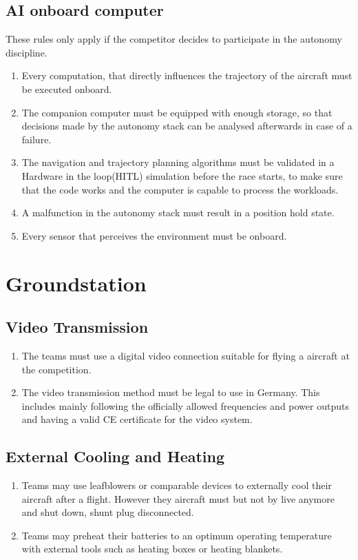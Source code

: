 \documentclass{article}
\begin{document}
\subsection{AI onboard computer}
These rules only apply if the competitor decides to participate in the autonomy discipline. 
\begin{enumerate}
  \item Every computation, that directly influences the trajectory of the aircraft must be executed onboard.
  \item The companion computer must be equipped with enough storage, so that decisions made by the autonomy stack can be analysed afterwards in case of a failure. 
  \item The navigation and trajectory planning algorithms must be validated in a Hardware in the loop(HITL) simulation before the race starts, to make sure that the code works and the computer is capable to process the workloads.
  \item A malfunction in the autonomy stack must result in a position hold state. 
  \item Every sensor that perceives the environment must be onboard.
\end{enumerate}


\section{Groundstation}
\subsection{Video Transmission}
\begin{enumerate}
  \item The teams must use a digital video connection suitable for flying a aircraft at the competition.  
  \item The video transmission method must be legal to use in Germany. This includes mainly following the officially allowed frequencies and power outputs and having a valid CE certificate for the video system.
\end{enumerate}

\subsection{External Cooling and Heating}
\begin{enumerate}
  \item Teams may use leafblowers or comparable devices to externally cool their aircraft after a flight. However they aircraft must but not by live anymore and shut down, shunt plug disconnected.  
  \item Teams may preheat their batteries to an optimum operating temperature with external tools such as heating boxes or heating blankets.
\end{enumerate}
\end{document}
